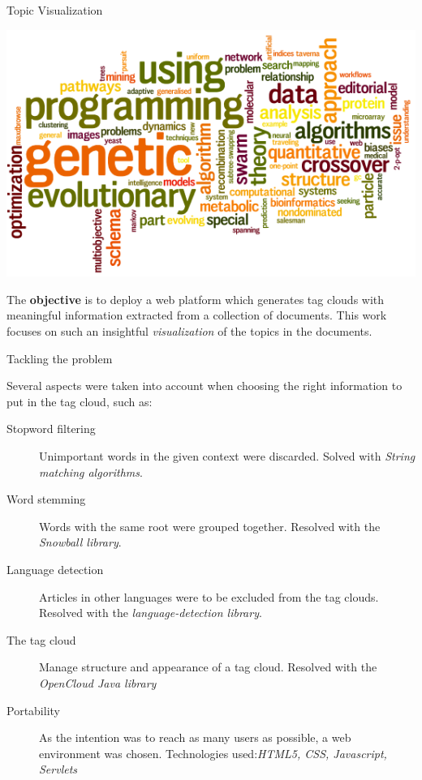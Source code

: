 \documentclass[a0paper, portrait]{baposter}
\begin{document}
\begin{poster}
\begin{posterbox}[name=intro, column=0, row=0]{Topic Visualization}
{    \includegraphics[width=\linewidth]{wordle2.png}
    \label{fig:1}
    
    The {\bf objective} is to deploy a web platform which generates tag clouds with meaningful information extracted from a collection of documents. This work focuses on such an insightful {\em visualization} of the topics in the documents. %
  }
  \end{posterbox}

  \begin{posterbox}[name=tech, column=0, below=intro]{Tackling the problem} {
    Several aspects were taken into account when choosing the right information to put in the tag cloud, such as: \newline
    \begin{description}
    \item[Stopword filtering] Unimportant words in the given context were discarded. Solved with {\em String matching algorithms\cite{Charras}}. 
    \item[Word stemming] Words with the same root were grouped together. Resolved with the {\em Snowball\cite{Porter} library}.
    \item[Language detection] Articles in other languages were to be excluded from the tag clouds. Resolved with the {\em language-detection\cite{Nakatani} library}.
    \item[The tag cloud] Manage structure and appearance of a tag cloud. Resolved with the {\em OpenCloud\cite{Mcavallo} Java library} 
    \item[Portability] As the intention was to reach as many users as possible, a web environment was chosen. Technologies used:{\em HTML5, CSS, Javascript, Servlets} 
    \end{description}
  }
  \end{posterbox}


\end{poster}
\end{document}
